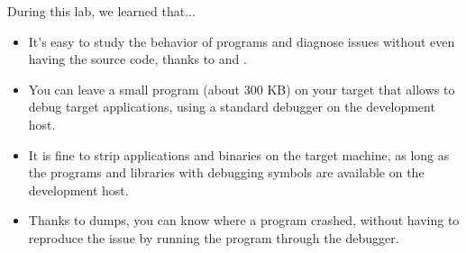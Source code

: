 During this lab, we learned that...
\begin{itemize}

\item It's easy to study the behavior of programs and diagnose issues
  without even having the source code, thanks to  and
  .

\item You can leave a small  program (about 300 KB) on your target
  that allows to debug target applications, using a standard 
  debugger on the development host.

\item It is fine to strip applications and binaries on the target
  machine, as long as the programs and libraries with debugging
  symbols are available on the development host.

\item Thanks to  dumps, you can know where a program crashed,
  without having to reproduce the issue by running the program through
  the debugger.

\end{itemize}
